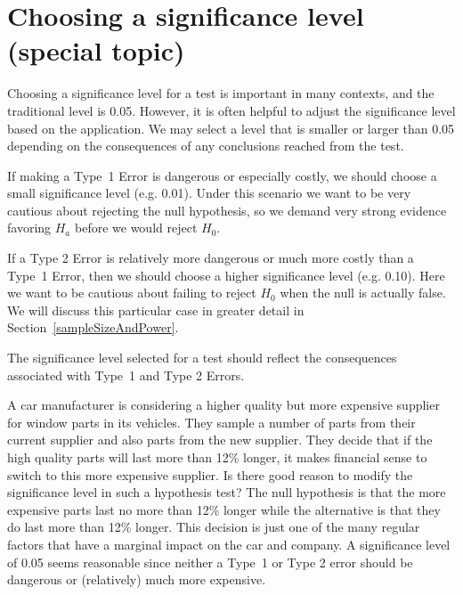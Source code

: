\section{Choosing a significance level (special topic)}
\label{significanceLevel}


Choosing a significance level for a test is important in many contexts, and the traditional level is 0.05. However, it is often helpful to adjust the significance level based on the application. We may select a level that is smaller or larger than 0.05 depending on the consequences of any conclusions reached from the test.

If making a Type~1 Error is dangerous or especially costly, we should choose a small significance level (e.g. 0.01). Under this scenario we want to be very cautious about rejecting the null hypothesis, so we demand very strong evidence favoring $H_a$ before we would reject $H_0$.

If a Type 2 Error is relatively more dangerous or much more costly than a Type~1 Error, then we should choose a higher significance level (e.g. 0.10). Here we want to be cautious about failing to reject $H_0$ when the null is actually false.  We will discuss this particular case in greater detail in Section~\ref{sampleSizeAndPower}.

\begin{tipBox}{
The significance level selected for a test should reflect the consequences associated with Type~1 and Type 2 Errors.}
\end{tipBox}

\begin{example}{A car manufacturer is considering a higher quality but more expensive supplier for window parts in its vehicles. They sample a number of parts from their current supplier and also parts from the new supplier. They decide that if the high quality parts will last more than 12\% longer, it makes financial sense to switch to this more expensive supplier. Is there good reason to modify the significance level in such a hypothesis test?}
The null hypothesis is that the more expensive parts last no more than 12\% longer while the alternative is that they do last more than 12\% longer. This decision is just one of the many regular factors that have a marginal impact on the car and company. A significance level of 0.05 seems reasonable since neither a Type~1 or Type 2 error should be dangerous or (relatively) much more expensive.
\end{example}

